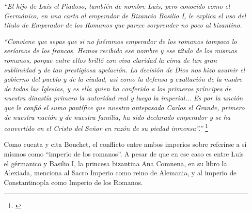 \textit{``El hijo de Luis el Piadoso, también de nombre Luis,
	pero conocido como el Germánico, en una carta al
	emperador de Bizancio Basilio I, le explica el uso del
	título de Emperador de los Romanos que parece sorprender
	no poco al bizantino.}

\textit{``Conviene que sepas que si no fuéramos emperador de los
	romanos tampoco lo seríamos de los francos. Hemos recibido
	ese nombre y ese título de los mismos romanos, porque
	entre ellos brilló con viva claridad la cima de tan gran
	sublimidad y de tan prestigiosa apelación.
	La decisión de Dios nos hizo asumir el gobierno del pueblo
	y de la ciudad, así como la defensa y exaltación de la madre
	de todas las Iglesias, y es ella quien ha conferido a los
	primeros príncipes de nuestra dinastía primero la autoridad
	real y luego la imperial...
	Es por la unción que le confió el sumo pontífice que
	nuestro antepasado Carlos el Grande, primero de nuestra
	nación y de nuestra familia, ha sido declarado emperador
	y se ha convertido en el Cristo del Señor en razón
	de su piedad inmensa''.''}
\footnote{\cite[p.~846]{ciudad}}

Como cuenta y cita Bouchet, el conflicto entre ambos imperios
sobre referirse a si mismos como ``imperio de los romanos''.
A pesar de que en ese caso es entre Luis el gérmanico y
Basilio I, la princesa bizantina Ana Comnena, en su libro
la Alexiada, menciona al Sacro Imperio como reino de Alemania,
y al imperio de Constantinopla como Imperio de los Romanos.





















